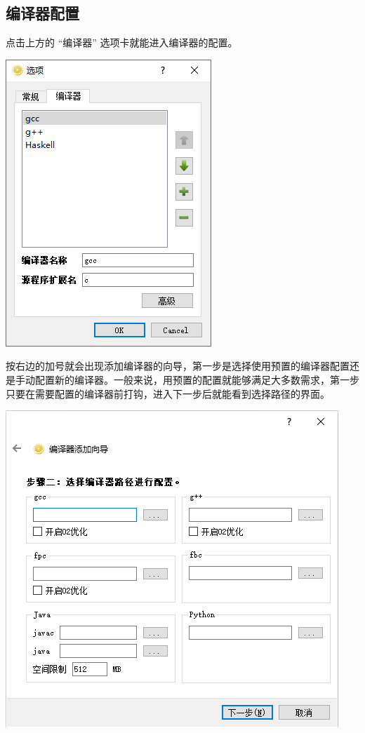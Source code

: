 \documentclass[12pt, a4paper]{article}
\begin{document}
\subsection{编译器配置}
点击上方的 “编译器” 选项卡就能进入编译器的配置。

\begin{center}
\includegraphics[scale=0.7]{pic/compilersettings.png}
\end{center}

按右边的加号就会出现添加编译器的向导，第一步是选择使用预置的编译器配置还是手动配置新的编译器。一般来说，用预置的配置就能够满足大多数需求，第一步只要在需要配置的编译器前打钩，进入下一步后就能看到选择路径的界面。

\begin{center}
\includegraphics[scale=0.6]{pic/addcompiler.png}
\end{center}
\end{document}
